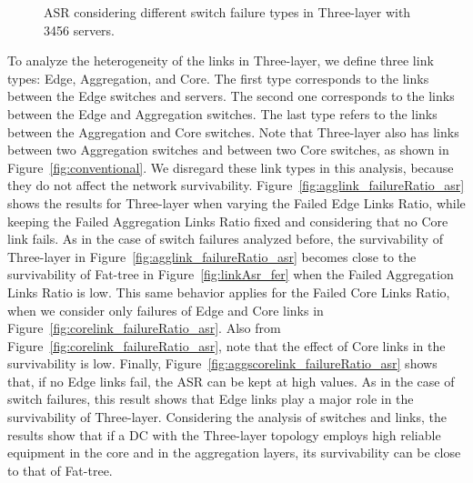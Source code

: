 \begin{figure}[h!]
\centering
{}
\caption{ASR considering different switch failure types in Three-layer with 3456 servers.}
\end{figure} 

To analyze the heterogeneity of the links in Three-layer, we define three link types: Edge, Aggregation, and Core. The first type corresponds to the links between the Edge switches and servers. The second one corresponds to the links between the Edge and Aggregation switches. The last type refers to the links between the Aggregation and Core switches. Note that Three-layer also has links between two Aggregation switches and between two Core switches, as shown in Figure~\ref{fig:conventional}. We disregard these link types in this analysis, because they do not affect the network survivability. Figure~\ref{fig:agglink_failureRatio_asr} shows the results for Three-layer when varying the Failed Edge Links Ratio, while keeping the Failed Aggregation Links Ratio fixed and considering that no Core link fails. As in the case of switch failures analyzed before, the survivability of Three-layer in Figure~\ref{fig:agglink_failureRatio_asr} becomes close to the survivability of Fat-tree in Figure~\ref{fig:linkAsr_fer} when the Failed Aggregation Links Ratio is low. This same behavior applies for the Failed Core Links Ratio, when we consider only failures of Edge and Core links in Figure~\ref{fig:corelink_failureRatio_asr}. Also from Figure~\ref{fig:corelink_failureRatio_asr}, note that the effect of Core links in the survivability is low. Finally, Figure~\ref{fig:aggscorelink_failureRatio_asr} shows that, if no Edge links fail, the ASR can be kept at high values. As in the case of switch failures, this result shows that Edge links play a major role in the survivability of Three-layer. Considering the analysis of switches and links, the results show that if a DC with the Three-layer topology employs high reliable equipment in the core and in the aggregation layers, its survivability can be close to that of Fat-tree.

